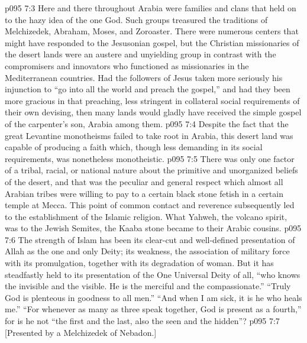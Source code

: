 \vs p095 7:3 Here and there throughout Arabia were families and clans that held on to the hazy idea of the one God. Such groups treasured the traditions of Melchizedek, Abraham, Moses, and Zoroaster. There were numerous centers that might have responded to the Jesusonian gospel, but the Christian missionaries of the desert lands were an austere and unyielding group in contrast with the compromisers and innovators who functioned as missionaries in the Mediterranean countries. Had the followers of Jesus taken more seriously his injunction to “go into all the world and preach the gospel,” and had they been more gracious in that preaching, less stringent in collateral social requirements of their own devising, then many lands would gladly have received the simple gospel of the carpenter’s son, Arabia among them.
\vs p095 7:4 Despite the fact that the great Levantine monotheisms failed to take root in Arabia, this desert land was capable of producing a faith which, though less demanding in its social requirements, was nonetheless monotheistic.
\vs p095 7:5 There was only one factor of a tribal, racial, or national nature about the primitive and unorganized beliefs of the desert, and that was the peculiar and general respect which almost all Arabian tribes were willing to pay to a certain black stone fetish in a certain temple at Mecca. This point of common contact and reverence subsequently led to the establishment of the Islamic religion. What Yahweh, the volcano spirit, was to the Jewish Semites, the Kaaba stone became to their Arabic cousins.
\vs p095 7:6 The strength of Islam has been its clear\hyp{}cut and well\hyp{}defined presentation of Allah as the one and only Deity; its weakness, the association of military force with its promulgation, together with its degradation of woman. But it has steadfastly held to its presentation of the One Universal Deity of all, “who knows the invisible and the visible. He is the merciful and the compassionate.” “Truly God is plenteous in goodness to all men.” “And when I am sick, it is he who heals me.” “For whenever as many as three speak together, God is present as a fourth,” for is he not “the first and the last, also the seen and the hidden”?
\vsetoff
\vs p095 7:7 [Presented by a Melchizedek of Nebadon.]
